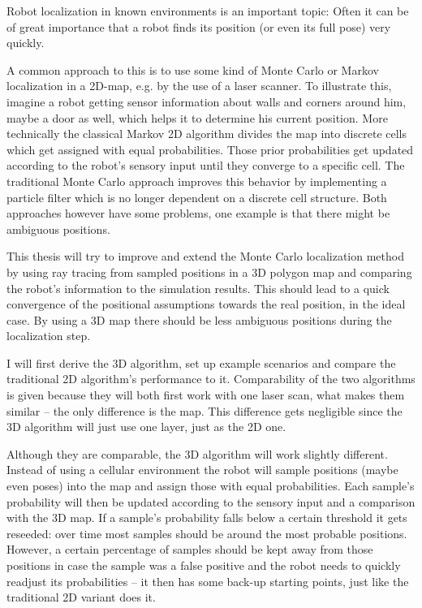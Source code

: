 \documentclass[Thesis.tex]{subfiles}
\begin{document}
Robot localization in known environments is an important topic: Often it can be of great importance that a robot finds its position (or even its full pose) very quickly.

A common approach to this is to use some kind of Monte Carlo or Markov localization in a 2D-map, e.g. by the use of a laser scanner. To illustrate this, imagine a robot getting sensor information about walls and corners around him, maybe a door as well, which helps it to determine his current position. More technically the classical Markov 2D algorithm divides the map into discrete cells which get assigned with equal probabilities. Those prior probabilities get updated according to the robot's sensory input until they converge to a specific cell. The traditional Monte Carlo approach improves this behavior by implementing a particle filter which is no longer dependent on a discrete cell structure. Both approaches however have some problems, one example is that there might be ambiguous positions.

\bigskip

This thesis will try to improve and extend the Monte Carlo localization method by using ray tracing from sampled positions in a 3D polygon map and comparing the robot's information to the simulation results. This should lead to a quick convergence of the positional assumptions towards the real position, in the ideal case. By using a 3D map there should be less ambiguous positions during the localization step.

I will first derive the 3D algorithm, set up example scenarios and compare the traditional 2D algorithm's performance to it. Comparability of the two algorithms is given because they will both first work with one laser scan, what makes them similar -- the only difference is the map. This difference gets negligible since the 3D algorithm will just use one layer, just as the 2D one.

\bigskip

Although they are comparable, the 3D algorithm will work slightly different. Instead of using a cellular environment the robot will sample positions (maybe even poses) into the map and assign those with equal probabilities. Each sample's probability will then be updated according to the sensory input and a comparison with the 3D map. If a sample's probability falls below a certain threshold it gets reseeded: over time most samples should be around the most probable positions. However, a certain percentage of samples should be kept away from those positions in case the sample was a false positive and the robot needs to quickly readjust its probabilities -- it then has some back-up starting points, just like the traditional 2D variant does it.
\end{document}
